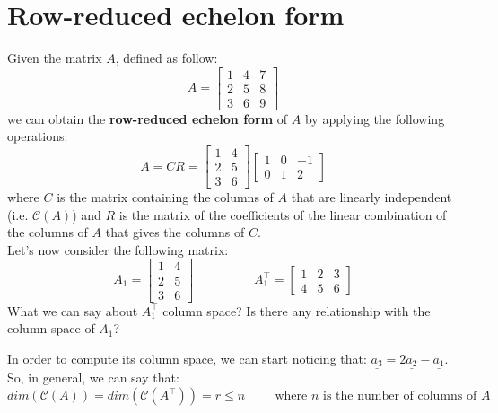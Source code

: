 

\section{Row-reduced echelon form}
Given the matrix $A$, defined as follow:
\[
A = \begin{bmatrix}
    1 & 4 & 7\\
    2 & 5 & 8\\
    3 & 6 & 9
\end{bmatrix}
\]
we can obtain the \textbf{row-reduced echelon form} of $A$ by applying the following operations:
\[
A = CR = \begin{bmatrix}
1 & 4\\
2 & 5\\
3 & 6
\end{bmatrix}
\begin{bmatrix}
    1 & 0 & -1\\
    0 & 1 & 2
\end{bmatrix}
\]
where $C$ is the matrix containing the columns of $A$ that are linearly independent (i.e. $\mathcal{C}(A)$) and $R$ is the matrix of the coefficients of the linear combination of the columns of $A$ that gives the columns of $C$.\\

Let's now consider the following matrix:
\[
A_1 = \begin{bmatrix}
1 & 4\\
2 & 5\\
3 & 6
\end{bmatrix}  
\hspace{2cm}
A_1^\intercal = \begin{bmatrix}
1 & 2 & 3\\
4 & 5 & 6
\end{bmatrix}  
\]
What we can say about $A_1^\intercal$ column space? Is there any relationship with the column space of $A_1$?

In order to compute its column space, we can start noticing that: $\underline{a_3} = 2\underline{a_2} - \underline{a_1}$. So, in general, we can say that:
\[
dim(\mathcal{C}(A)) = dim(\mathcal{C}(A^\intercal)) = r \leq n \hspace{1cm} \text{where $n$ is the number of columns of $A$}
\]




